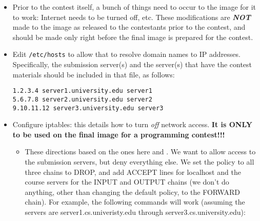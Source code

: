 \begin{itemize}
\item
  Prior to the contest itself, a bunch of things need to occur to the
  image for it to work: Internet needs to be turned off, etc. These
  modifications are \textbf{\emph{NOT}} made to the image as released
  to the contestants prior to the contest, and should be made only
  right before the final image is prepared for the contest.
\item
  Edit {\tt /etc/hosts} to allow that to resolve domain names to IP
  addresses.  Specifically, the submission server(s) and the server(s)
  that have the contest materials should be included in that file, as
  follows:

\begin{verbatim}
1.2.3.4 server1.university.edu server1
5.6.7.8 server2.university.edu server2
9.10.11.12 server3.university.edu server3
\end{verbatim}
\item
  Configure iptables: this details how to turn \emph{off} network
  access. \textbf{It is ONLY to be used on the final image for a
  programming contest!!!}

  \begin{itemize}
  \item
    These directions based on the ones here and .
    We want to allow access to the submission servers, but deny
    everything else. We set the policy to all three chains to DROP, and
    add ACCEPT lines for localhost and the course servers for the INPUT
    and OUTPUT chains (we don't do anything, other than changing the
    default policy, to the FORWARD chain). For example, the following
    commands will work (assuming the servers are
    server1.cs.univeristy.edu through server3.cs.university.edu):


\end{itemize}
\end{itemize}
